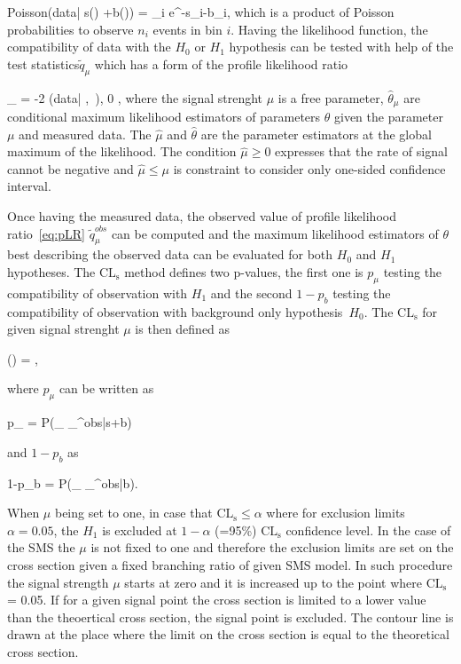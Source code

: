 {
Poisson(data| \mu s(\theta) +b(\theta))  = \prod_{i}  e^{-\mu s_{i}-b_{i}},
}
which is a product  of Poisson probabilities to observe $n_{i}$ events in bin $i$. Having the likelihood function, the compatibility of data with the $H_{0}$ or $H_{1}$ hypothesis can be tested with help of the test statistics$\tilde{q}_{\mu}$ which has a form of the profile likelihood ratio

{
_{\mu} = -2   {(data| \hat{\mu} ,~\hat{\theta})}, 0 \leq \hat{\mu} \leq \mu ,
}
where the signal strenght $\mu$ is a free parameter, $\hat{\theta}_{\mu}$ are conditional maximum likelihood estimators of parameters $\theta$ given the parameter $\mu$ and measured data. The $\hat{\mu}$ and $\hat{\theta}$ are the parameter estimators at the global maximum of the likelihood. The condition $\hat{\mu} \geq 0 $ expresses that the rate of signal cannot be negative and $\hat{\mu} \leq \mu $ is constraint to consider only one-sided confidence interval.
	  
Once having the measured data, the observed value of profile likelihood ratio~\ref{eq:pLR} $\tilde{q}_{\mu}^{obs}$ can be computed and the maximum likelihood estimators of $\theta$ best describing the observed data can be evaluated for both $H_{0}$ and $H_{1}$ hypotheses. The $\mathrm{CL_{s}}$  method defines two p-values, the first one is $p_{\mu}$ testing the compatibility of observation with $H_{1}$ and the second $1-p_{b}$ testing the compatibility of observation with background only hypothesis~$H_{0}$. The $\mathrm{CL_{s}}$ for given signal strenght $\mu$ is then defined as

{
(\mu) = ,
}

where $p_{\mu}$ can be written as

{
p_{\mu} = P(_{\mu} \geq {}_{\mu}^{obs}|s+b)
}

and $1-p_{b}$ as

{
1-p_{b} = P(_{\mu} \geq {}_{\mu}^{obs}|b).
}

When $\mu$ being set to one, in case that $\mathrm{CL_{s}} \leq \alpha$ where for exclusion limits $\alpha = 0.05$, the $H_{1}$ is excluded at $1-\alpha$ (=95\%) $\mathrm{CL_{s}}$ confidence level. In the case of the  SMS the $\mu$ is not fixed to one and therefore the exclusion limits are set on the cross section given a fixed branching ratio of given SMS model. In such procedure the signal strength $\mu$ starts at zero and it is increased up to the point where $\mathrm{CL_{s}}$ = 0.05. If for a given signal point the cross section is limited to a lower value than the theoertical cross section, the signal point is excluded. The contour line is drawn at the place where the limit on the cross section is equal to the theoretical cross section.

